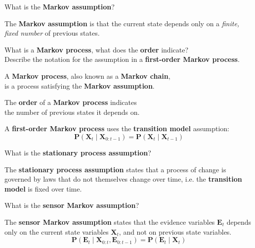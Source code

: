 
\newcommand{\argmax}{\operatornamewithlimits{argmax}}

\begin{flashcard}[Question]{What is the \textbf{Markov assumption}?}
\begin{center}
The \textbf{Markov assumption} is that the current state depends only on a \textit{finite, fixed number} of previous states.
\end{center}
\end{flashcard}

\begin{flashcard}[Question]{What is a \textbf{Markov process}, what does the \textbf{order} indicate?\\Describe the notation for the assumption in a \textbf{first-order Markov process}.}
\begin{center}
A \textbf{Markov process}, also known as a \textbf{Markov chain},\\is a process satisfying the \textbf{Markov assumption}.

\medskip

The \textbf{order} of a \textbf{Markov process} indicates\\the number of previous states it depends on.

\medskip

A \textbf{first-order Markov process} uses the \textbf{transition model} assumption:
\begin{displaymath}
\mathbf{P}(\mathbf{X}_t \mid \mathbf{X}_{0:t-1}) = \mathbf{P}(\mathbf{X}_t \mid \mathbf{X}_{t-1})
\end{displaymath}
\end{center}
\end{flashcard}

\begin{flashcard}[Question]{What is the \textbf{stationary process assumption}?}
\begin{center}
The \textbf{stationary process assumption} states that a process of change is governed by laws that do not themselves change over time, i.e. the \textbf{transition model} is fixed over time.
\end{center}
\end{flashcard}

\begin{flashcard}[Question]{What is the \textbf{sensor Markov assumption}?}
\begin{center}
The \textbf{sensor Markov assumption} states that the evidence variables $\mathbf{E}_t$ depends only on the current state variables $\mathbf{X}_t$, and not on previous state variables.
\begin{displaymath}
\mathbf{P}(\mathbf{E}_t \mid \mathbf{X}_{0:t}, \mathbf{E}_{0:t-1}) = \mathbf{P}(\mathbf{E}_t \mid \mathbf{X}_t)
\end{displaymath}
\end{center}
\end{flashcard}

